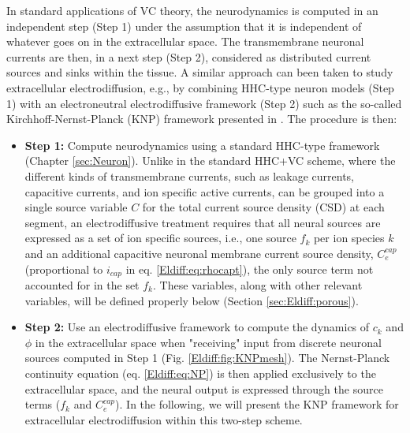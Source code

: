 In standard applications of VC theory, the neurodynamics is computed in an independent step (Step 1) under the assumption that it is independent of whatever goes on in the extracellular space. The transmembrane neuronal currents are then, in a next step (Step 2), considered as distributed current sources and sinks within the tissue. A similar approach can been taken to study extracellular electrodiffusion, e.g., by combining HHC-type neuron models (Step 1) with an electroneutral electrodiffusive framework (Step 2) such as the so-called Kirchhoff-Nernst-Planck (KNP) framework presented in \cite{Solbra2018}. The procedure is then:

\begin{itemize}
\item {\bf Step 1:} Compute neurodynamics using a standard HHC-type framework (Chapter \ref{sec:Neuron}). Unlike in the standard HHC+VC scheme, where the different kinds of transmembrane currents, such as leakage currents, capacitive currents, and ion specific active currents, can be grouped into a single source variable $C$ for the total current source density (CSD) at each segment, an electrodiffusive treatment requires that all neural sources are expressed as a set of ion specific sources, i.e., one source $f_k$ per ion species $k$ and an additional capacitive neuronal membrane current source density, $C_e^{cap}$ (proportional to $i_{cap}$ in eq. \ref{Eldiff:eq:rhocapt}), the only source term not accounted for in the set $f_k$. These variables, along with other relevant variables, will be defined properly below (Section \ref{sec:Eldiff:porous}).

\item {\bf Step 2:} Use an electrodiffusive framework to compute the dynamics of $c_k$ and $\phi$ in the extracellular space when "receiving" input from discrete neuronal sources computed in Step 1 (Fig. \ref{Eldiff:fig:KNPmesh}). The Nernst-Planck continuity equation (eq. \ref{Eldiff:eq:NP}) is then applied exclusively to the extracellular space, and the neural output is expressed through the source terms ($f_k$ and  $C_e^{cap}$). In the following, we will present the KNP framework for extracellular electrodiffusion within this two-step scheme.
\end{itemize}

